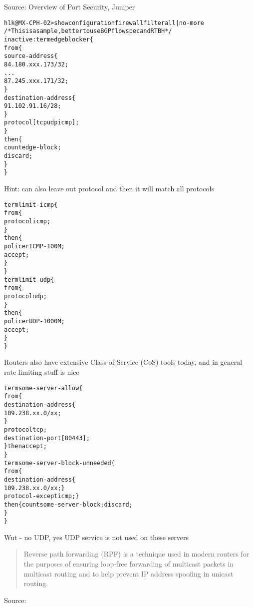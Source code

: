 \documentclass[Screen16to9,17pt]{foils}
\begin{document}
Source: Overview of Port Security, Juniper\\ {\small{}}





\begin{alltt}\footnotesize
hlk@MX-CPH-02> show configuration firewall filter all | no-more
/* This is a sample, better to use BGP flowspec and RTBH */
inactive: term edgeblocker \{
    from \{
        source-address \{
            84.180.xxx.173/32;
...
            87.245.xxx.171/32;
        \}
        destination-address \{
            91.102.91.16/28;
        \}
        protocol [ tcp udp icmp ];
    \}
    then \{
        count edge-block;
        discard;
    \}
\}
\end{alltt}
Hint: can also leave out protocol and then it will match all protocols


\begin{alltt}\footnotesize
term limit-icmp \{
    from \{
        protocol icmp;
    \}
    then \{
        policer ICMP-100M;
        accept;
    \}
\}
term limit-udp \{
    from \{
        protocol udp;
    \}
    then \{
        policer UDP-1000M;
        accept;
    \}
\}
\end{alltt}

Routers also have extensive Class-of-Service (CoS) tools today, and in general rate limiting stuff is nice


\begin{alltt}\footnotesize
term some-server-allow \{
    from \{
        destination-address \{
            109.238.xx.0/xx;
        \}
        protocol tcp;
        destination-port [ 80 443 ];
    \} then accept;
\}
term some-server-block-unneeded \{
    from \{
        destination-address \{
            109.238.xx.0/xx; \}
        protocol-except icmp;  \}
    then \{ count some-server-block; discard;
    \}
\}
\end{alltt}

Wut - no UDP, yes UDP service is not used on these servers



\begin{quote}
Reverse path forwarding (RPF) is a technique used in modern routers for the purposes of ensuring loop-free forwarding of multicast packets in multicast routing and to help prevent IP address spoofing in unicast routing.
\end{quote}
Source: 
\end{document}

